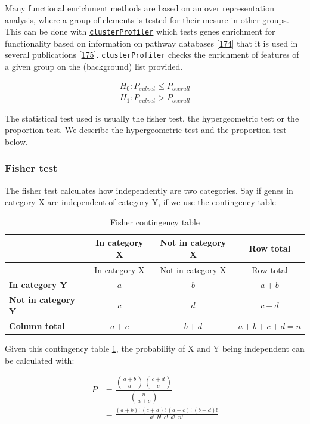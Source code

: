 \documentclass[
  12pt,
  a4paper,
  twoside,
  openright]{book}
\begin{document}
Many functional enrichment methods are based on an over representation analysis, where a group of elements is tested for their mesure in other groups.
This can be done with \href{https://bioconductor.org/packages/clusterProfiler}{\texttt{clusterProfiler}} which tests genes enrichment for functionality based on information on pathway databases {[}\protect\hyperlink{ref-wu2021}{174}{]} that it is used in several publications {[}\protect\hyperlink{ref-richter2021}{175}{]}.
\texttt{clusterProfiler} checks the enrichment of features of a given group on the (background) list provided.

\[
\begin{aligned}
H_0 : P_{subset} \leq  P_{overall} \\
H_1 : P_{subset} > P_{overall}
\end{aligned}
\]

The statistical test used is usually the fisher test, the hypergeometric test or the proportion test.
We describe the hypergeometric test and the proportion test below.

\hypertarget{fisher-test}{%
\subsubsection{Fisher test}\label{fisher-test}}

The fisher test calculates how independently are two categories.
Say if genes in category X are independent of category Y, if we use the contingency table

\begin{longtable}[]{@{}lccc@{}}
\caption{\label{tab:fisher} Fisher contingency table}\tabularnewline
\toprule
& In category X & Not in category X & Row total \\
\midrule
\endfirsthead
\toprule
& In category X & Not in category X & Row total \\
\midrule
\endhead
\textbf{In category Y} & \(a\) & \(b\) & \(a+b\) \\
\textbf{Not in category Y} & \(c\) & \(d\) & \(c+d\) \\
\textbf{Column total} & \(a+c\) & \(b+d\) & \(a+b+c+d = n\) \\
\bottomrule
\end{longtable}

Given this contingency table \ref{tab:fisher}, the probability of X and Y being independent can be calculated with:

\[
\begin{aligned}
P & = \dfrac{ \binom{a+b}{a} \binom{c+d}{c} }{\binom{n}{a+c}} \\
& = \frac{(a+b)!~(c+d)!~(a+c)!~(b+d)!}{a!~~b!~~c!~~d!~~n!}
\end{aligned}
\]
\end{document}
